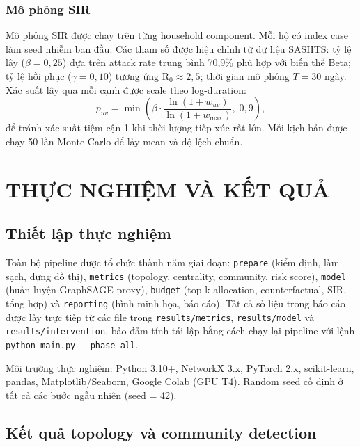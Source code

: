 \documentclass[12pt,a4paper]{report}
\theoremstyle{definition}
\begin{document}
\subsection{Mô phỏng SIR}

Mô phỏng SIR được chạy trên từng household component. Mỗi hộ có index case làm seed nhiễm ban đầu. Các tham số được hiệu chỉnh từ dữ liệu SASHTS: tỷ lệ lây ($\beta = 0{,}25$) dựa trên attack rate trung bình 70,9\% phù hợp với biến thể Beta; tỷ lệ hồi phục ($\gamma = 0{,}10$) tương ứng R$_0 \approx 2{,}5$; thời gian mô phỏng $T = 30$ ngày. Xác suất lây qua mỗi cạnh được scale theo log-duration:
\begin{equation}
  p_{uv} = \min\!\left(\beta \cdot \frac{\ln(1 + w_{uv})}{\ln(1 + w_{\max})},\; 0{,}9\right),
  \label{eq:sir_prob}
\end{equation}
để tránh xác suất tiệm cận 1 khi thời lượng tiếp xúc rất lớn. Mỗi kịch bản được chạy 50 lần Monte Carlo để lấy mean và độ lệch chuẩn.

\chapter{THỰC NGHIỆM VÀ KẾT QUẢ}

\section{Thiết lập thực nghiệm}

Toàn bộ pipeline được tổ chức thành năm giai đoạn: \texttt{prepare} (kiểm định, làm sạch, dựng đồ thị), \texttt{metrics} (topology, centrality, community, risk score), \texttt{model} (huấn luyện GraphSAGE proxy), \texttt{budget} (top-k allocation, counterfactual, SIR, tổng hợp) và \texttt{reporting} (hình minh họa, báo cáo). Tất cả số liệu trong báo cáo được lấy trực tiếp từ các file trong \texttt{results/metrics}, \texttt{results/model} và \texttt{results/intervention}, bảo đảm tính tái lập bằng cách chạy lại pipeline với lệnh \verb|python main.py --phase all|.

Môi trường thực nghiệm: Python 3.10+, NetworkX 3.x, PyTorch 2.x, scikit-learn, pandas, Matplotlib/Seaborn, Google Colab (GPU T4). Random seed cố định ở tất cả các bước ngẫu nhiên (seed = 42).

\section{Kết quả topology và community detection}
\end{document}
